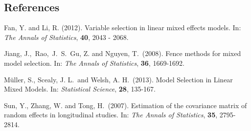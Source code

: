 \documentclass[12pt]{article}
\begin{document}
%
%
%

\subsection*{References}

\begin{description}
\item 
Fan, Y. and Li, R. (2012).
Variable selection in linear mixed effects models.
In: \textit{The Annals of Statistics}, \textbf{40}, 2043 - 2068.
\item
Jiang, J.,~Rao,~J.~S.~Gu, Z. and Nguyen, T.~(2008). 
Fence methods for mixed model selection.
In: \textit{The Annals of Statistics}, \textbf{36}, 1669-1692.
\item
M\"{u}ller, S., Scealy, J. L.~and Welsh, A. H.~(2013). 
Model Selection in Linear Mixed Models.
In: \textit{Statistical Science}, \textbf{28}, 135-167.
\item
Sun, Y., Zhang, W. and Tong, H.~(2007). 
Estimation of the covariance matrix of random effects in longitudinal studies.
In: \textit{The Annals of Statistics}, \textbf{35}, 2795-2814.
\end{description}
\end{document}
